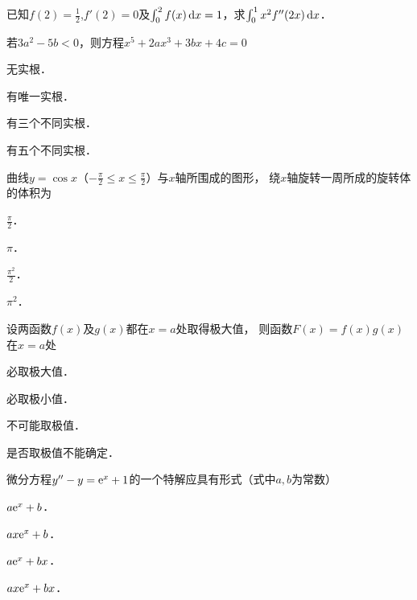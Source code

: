 \documentclass[plain,noanswer,medmath]{../../template/jnuexam}
\begin{document}
\begin{problem}
已知$f(2)=\frac{1}{2}$,$f'(2)=0$及$\int_0^2f(x)\mathop{}\!\mathrm{d} x=1$，求$\int_0^1x^2f''(2x)\mathop{}\!\mathrm{d} x$．
\end{problem}






\begin{problem}
若$3a^2-5b<0$，则方程$x^5+2ax^3+3bx+4c=0$ \pickout{}
\begin{abcd}
\item 无实根．
\item 有唯一实根．
\item 有三个不同实根．
\item 有五个不同实根．
\end{abcd}
\end{problem}


\begin{problem}
曲线$y=\cos x$（$-\frac{\pi}{2}\le x\le \frac{\pi}{2}$）与$x$轴所围成的图形，
绕$x$轴旋转一周所成的旋转体的体积为 \pickout{}
\begin{abcd}
\item $\frac{\pi}{2}$．
\item $\pi$．
\item $\frac{\pi^2}{2}$．
\item $\pi^2$．
\end{abcd}
\end{problem}


\begin{problem}
设两函数$f(x)$及$g(x)$都在$x=a$处取得极大值，
则函数$F(x)=f(x)g(x)$在$x=a$处 \pickout{}
\begin{abcd}
\item 必取极大值．
\item 必取极小值．
\item 不可能取极值．
\item 是否取极值不能确定．
\end{abcd}
\end{problem}


\begin{problem}
微分方程$y''-y=\mathrm{e}^x+1$的一个特解应具有形式（式中$a,b$为常数） \pickout{}
\begin{abcd}
\item $a\mathrm{e}^x+b$．
\item $ax\mathrm{e}^x+b$．
\item $a\mathrm{e}^x+bx$．
\item $ax\mathrm{e}^x+bx$．
\end{abcd}
\end{problem}
\end{document}

